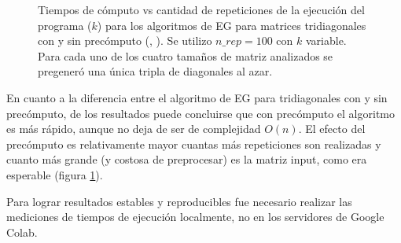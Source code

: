 \begin{figure}[!ht]
    \centering
    \caption{Tiempos de cómputo vs cantidad de repeticiones de la ejecución del programa ($k$) para los algoritmos de EG para matrices tridiagonales con y sin precómputo (, ). Se utilizo $n\_rep=100$ con $k$ variable. Para cada uno de los cuatro tamaños de matriz analizados se pregeneró una única tripla de diagonales al azar.}
    \label{fig:EG_tridiag_sin_vs_con_precomp}
\end{figure}

En cuanto a la diferencia entre el algoritmo de EG para tridiagonales con y sin precómputo, de los resultados puede concluirse que con precómputo el algoritmo es más rápido, aunque no deja de ser de complejidad $O(n)$. El efecto del precómputo es relativamente mayor cuantas más repeticiones son realizadas y cuanto más grande (y costosa de preprocesar) es la matriz input, como era esperable (figura \ref{fig:EG_tridiag_sin_vs_con_precomp}).

Para lograr resultados estables y reproducibles fue necesario realizar las mediciones de tiempos de ejecución localmente, no en los servidores de Google Colab.